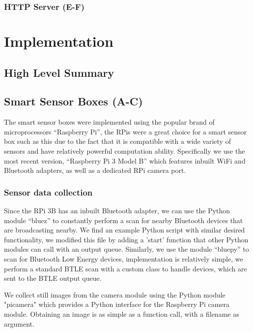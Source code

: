 \documentclass{l4proj}
\begin{document}
\subsection{HTTP Server (E-F)}




\chapter{Implementation}


\section{High Level Summary}
\section{Smart Sensor Boxes (A-C)}
The smart sensor boxes were implemented using the popular brand of microprocessors “Raspberry Pi”, the RPis were a great choice for a smart sensor box such as this due to the fact that it is compatible with a wide variety of sensors and have relatively powerful computation ability. Specifically we use the most recent version, “Raspberry Pi 3 Model B” which features inbuilt WiFi and Bluetooth adapters, as well as a dedicated RPi camera port.

\subsection{Sensor data collection}
Since the RPi 3B has an inbuilt Bluetooth adapter, we can use the Python module “bluez” to constantly perform a scan for nearby Bluetooth devices that are broadcasting nearby. We find an example Python script with similar desired functionality, we modified this file by adding a 'start' function that other Python modules can call with an output queue. Similarly, we use the module “bluepy” to scan for Bluetooth Low Energy devices, implementation is relatively simple, we perform a standard BTLE scan with a custom class to handle devices, which are sent to the BTLE output queue. 

We collect still images from the camera module using the Python module "picamera" which provides a Python interface for the Raspberry Pi camera module. Obtaining an image is as simple as a function call, with a filename as argument.
\end{document}
